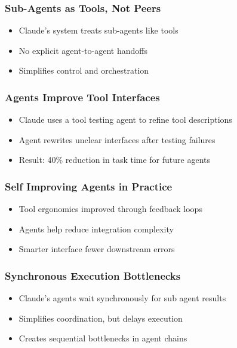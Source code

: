 \begin{frame}[fragile]\frametitle{Sub-Agents as Tools, Not Peers}
    \begin{itemize}
        \item Claude's system treats sub-agents like tools
        \item No explicit agent-to-agent handoffs
        \item Simplifies control and orchestration
    \end{itemize}
\end{frame}

\begin{frame}[fragile]\frametitle{Agents Improve Tool Interfaces}
    \begin{itemize}
        \item Claude uses a tool testing agent to refine tool descriptions
        \item Agent rewrites unclear interfaces after testing failures
        \item Result: 40\% reduction in task time for future agents
    \end{itemize}
\end{frame}

\begin{frame}[fragile]\frametitle{Self Improving Agents in Practice}
    \begin{itemize}
        \item Tool ergonomics improved through feedback loops
        \item Agents help reduce integration complexity
        \item Smarter interface   fewer downstream errors
    \end{itemize}
\end{frame}

\begin{frame}[fragile]\frametitle{Synchronous Execution   Bottlenecks}
    \begin{itemize}
        \item Claude's agents wait synchronously for sub agent results
        \item Simplifies coordination, but delays execution
        \item Creates sequential bottlenecks in agent chains
    \end{itemize}
\end{frame}

